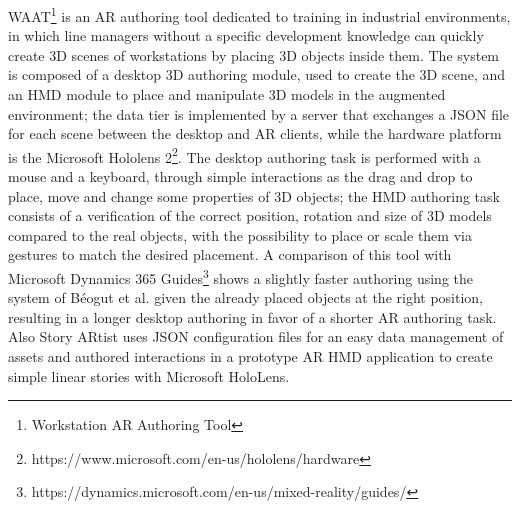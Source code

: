 WAAT\footnote{Workstation AR Authoring Tool} \cite{de_paolis_waat_2020} is an AR authoring tool dedicated to training in industrial environments, in which line managers without a specific development knowledge can quickly create 3D scenes of workstations by placing 3D objects inside them. The system is composed of a desktop 3D authoring module, used to create the 3D scene, and an HMD module to place and manipulate 3D models in the augmented environment; the data tier is implemented by a server that exchanges a JSON file for each scene between the desktop and AR clients, while the hardware platform is the Microsoft Hololens 2\footnote{https://www.microsoft.com/en-us/hololens/hardware}. The desktop authoring task is performed with a mouse and a keyboard, through simple interactions as the drag and drop to place, move and change some properties of 3D objects; the HMD authoring task consists of a verification of the correct position, rotation and size of 3D models compared to the real objects, with the possibility to place or scale them via gestures to match the desired placement.
A comparison of this tool with Microsoft Dynamics 365 Guides\footnote{https://dynamics.microsoft.com/en-us/mixed-reality/guides/} shows a slightly faster authoring using the system of Béogut et al. given the already placed objects at the right position, resulting in a longer desktop authoring in favor of a shorter AR authoring task.\\
Also Story ARtist \cite{kegeleers_story_2021} uses JSON configuration files for an easy data management of assets and authored interactions in a prototype AR HMD application to create simple linear stories with Microsoft HoloLens.